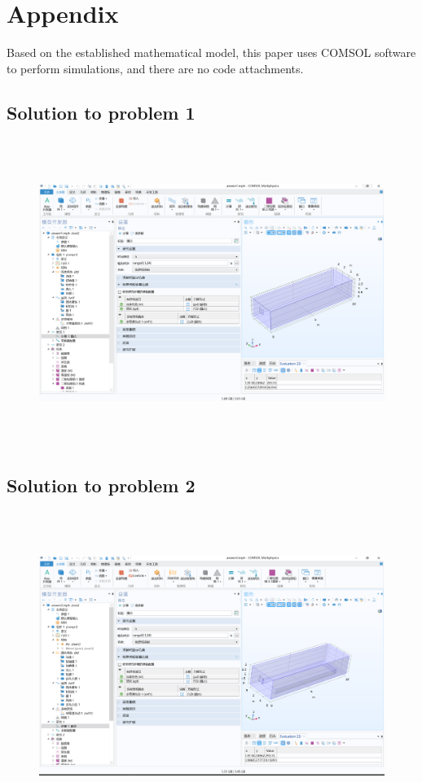 \documentclass{apmcmthesis}
\begin{document}
{\newpage

\section{Appendix}
Based on the established mathematical model, this paper uses COMSOL software to perform simulations, and there are no code attachments.
\subsection{Solution to problem 1} %
\begin{figure}[htbp]
    \centering
    \includegraphics[width=15cm,height=10cm]{figures/last1.png}
\end{figure}
\newpage
\subsection{Solution to problem 2} %
\begin{figure}[htbp]
    \centering
    \includegraphics[width=15cm,height=10cm]{figures/last2.png}
\end{figure}

}
\end{document}

